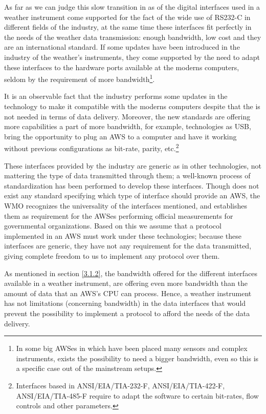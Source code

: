 As far as we can judge this slow transition in as of the digital interfaces used in a weather instrument come supported for the fact of the wide use of \gls{RS232}-C in different fields of the industry, at the same time these interfaces fit perfectly in the needs of the weather data transmission: enough bandwidth, low cost and they are an international standard. If some updates have been introduced in the industry of the weather's instruments, they come supported by the need to adapt these interfaces to the hardware ports available at the moderns computers, seldom by the requirement of more bandwidth\footnote{In some big \gls{AWS}es in which have been placed many sensors and complex instruments, exists the possibility to need a bigger bandwidth, even so this is a specific case out of the mainstream setups.}.

It is an observable fact that the industry performs some updates in the technology to make it compatible with the moderns computers despite that the is not needed in terms of data  delivery. Moreover, the new standards are offering more capabilities a part of more bandwidth, for example, technologies as \gls{USB}, bring the opportunity to plug an \gls{AWS} to a computer and have it working without previous configurations as bit-rate, parity, etc.\footnote{Interfaces based in ANSI/EIA/TIA-232-F, ANSI/EIA/TIA-422-F, ANSI/EIA/TIA-485-F require to adapt the software to certain bit-rates, flow controls and other parameters.}

These interfaces provided by the industry are generic as in other technologies, not mattering the type of data transmitted through them; a well-known process of standardization has been performed to develop these interfaces. Though does not exist any standard specifying which type of interface should provide an \gls{AWS}, the \gls{WMO} recognizes the universality of the interfaces mentioned, and establishes them as requirement for the \gls{AWS}es performing official measurements for governmental organizations\cite{GMIMO}. Based on this we assume that a protocol implemented in an \gls{AWS} must work under these technologies; because these interfaces are generic, they have not any requirement for the data transmitted, giving complete freedom to us to implement any protocol over them.

As mentioned in section \ref{3.1.2}, the bandwidth offered for the different interfaces available in a weather instrument, are offering even more bandwidth than the amount of data that an \gls{AWS}'s CPU can process. Hence, a weather instrument has not limitations (concerning bandwidth) in the data interfaces that would prevent the possibility to implement a protocol to afford the needs of the data delivery.

